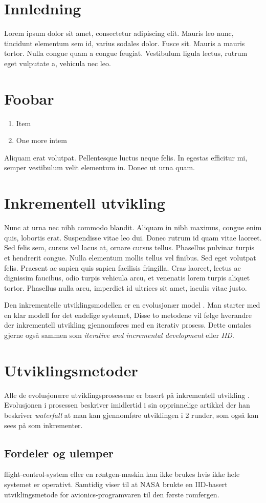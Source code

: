 
\section{Innledning}
Lorem ipsum dolor sit amet, consectetur adipiscing elit. Mauris leo nunc, tincidunt elementum sem id, varius sodales dolor. Fusce sit.
Mauris a mauris tortor. Nulla congue quam a congue feugiat. Vestibulum ligula lectus, rutrum eget vulputate a, vehicula nec leo.

\section{Foobar}
\begin{enumerate}
\item Item
\item One more intem
\end{enumerate}

Aliquam erat volutpat. Pellentesque luctus neque felis. In egestas efficitur mi, semper vestibulum velit elementum in. Donec ut urna quam.


\section{Inkrementell utvikling}
Nunc at urna nec nibh commodo blandit. Aliquam in nibh maximus, congue enim quis, lobortis erat. Suspendisse vitae leo dui. Donec rutrum id quam vitae laoreet. Sed felis sem, cursus vel lacus at, ornare cursus tellus. Phasellus pulvinar turpis et hendrerit congue. Nulla elementum mollis tellus vel finibus. Sed eget volutpat felis. Praesent ac sapien quis sapien facilisis fringilla. Cras laoreet, lectus ac dignissim faucibus, odio turpis vehicula arcu, et venenatis lorem turpis aliquet tortor. Phasellus nulla arcu, imperdiet id ultrices sit amet, iaculis vitae justo.


Den inkrementelle utviklingsmodellen er en evolusjonær model \cite{wiki:incremental_build_model}. Man starter med en klar modell for det endelige systemet, 
Disse to metodene vil følge hverandre der inkrementell utvikling gjennomføres med en iterativ prosess.
Dette omtales gjerne også sammen som \textit{iterative and incremental development} eller \textit{IID}.


\section{Utviklingsmetoder}
Alle de evolusjonære utviklingsprosessene er basert på inkrementell utvikling \cite{larman2003iterative}. Evolusjonen i prosessen 
\textcite{royce1970software} beskriver imidlertid i sin opprinnelige artikkel der han beskriver \textit{waterfall} at man kan 
gjennomføre utviklingen i 2 runder, som også kan sees på som inkrementer.

\subsection{Fordeler og ulemper}
flight-control-system eller en røntgen-maskin kan ikke brukes hvis ikke hele systemet er operativt. Samtidig viser
\textcite{larman2003iterative} til at NASA brukte en IID-basert utviklingsmetode for avionics-programvaren til den første romfergen.

